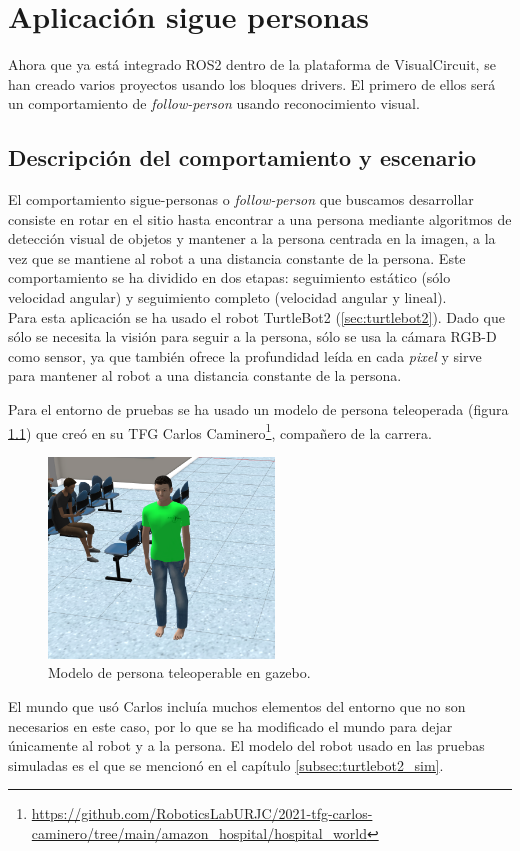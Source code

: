 \chapter{Aplicación sigue personas}
\label{cap:capitulo5}
Ahora que ya está integrado ROS2 dentro de la plataforma de VisualCircuit, se han creado varios proyectos usando los bloques drivers.
El primero de ellos será un comportamiento de \textit{follow-person} usando reconocimiento visual.

\section{Descripción del comportamiento y escenario}
\label{sec:FP_intro}

El comportamiento sigue-personas o \textit{follow-person} que buscamos desarrollar consiste en rotar en el sitio hasta encontrar
a una persona mediante algoritmos de detección visual de objetos y mantener a la persona centrada en la imagen, a la vez que se
mantiene al robot a una distancia constante de la persona. Este comportamiento se ha dividido en dos etapas: seguimiento estático
(sólo velocidad angular) y seguimiento completo (velocidad angular y lineal).\\

Para esta aplicación se ha usado el robot TurtleBot2 (\ref{sec:turtlebot2}). Dado que sólo se necesita la visión para seguir a la
persona, sólo se usa la cámara RGB-D como sensor, ya que también ofrece la profundidad leída en cada \textit{pixel} y sirve para
mantener al robot a una distancia constante de la persona.

Para el entorno de pruebas se ha usado un modelo de persona teleoperada (figura \ref{fig:teleop_person}) que creó en su TFG Carlos
Caminero\footnote{\url{https://github.com/RoboticsLabURJC/2021-tfg-carlos-caminero/tree/main/amazon_hospital/hospital_world}}, compañero
de la carrera.

\begin{figure} [H]
    \begin{center}
        \includegraphics[width=6cm]{figs/c5/elman.png}
    \end{center}
    \caption[Modelo de persona en gazebo]{Modelo de persona teleoperable en gazebo.}
    \label{fig:teleop_person}
\end{figure}
El mundo que usó Carlos incluía muchos elementos del entorno que no son necesarios en este caso, por lo que se ha modificado el
mundo para dejar únicamente al robot y a la persona. El modelo del robot usado en las pruebas simuladas es el que se mencionó en el
capítulo \ref{subsec:turtlebot2_sim}.\\

